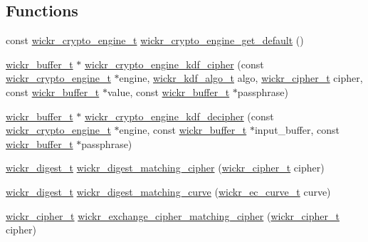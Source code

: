 \subsection*{Functions}
\begin{DoxyCompactItemize}
\item 
const \mbox{\hyperlink{structwickr__crypto__engine}{wickr\+\_\+crypto\+\_\+engine\+\_\+t}} \mbox{\hyperlink{group__wickr__crypto__engine_ga74d5cea6c7d1d6e67b1be476fbaf6235}{wickr\+\_\+crypto\+\_\+engine\+\_\+get\+\_\+default}} ()
\item 
\mbox{\hyperlink{structwickr__buffer}{wickr\+\_\+buffer\+\_\+t}} $\ast$ \mbox{\hyperlink{group__wickr__crypto__engine_ga5709d94cd09ef0fb47d1a5f59232f115}{wickr\+\_\+crypto\+\_\+engine\+\_\+kdf\+\_\+cipher}} (const \mbox{\hyperlink{structwickr__crypto__engine}{wickr\+\_\+crypto\+\_\+engine\+\_\+t}} $\ast$engine, \mbox{\hyperlink{structwickr__kdf__algo}{wickr\+\_\+kdf\+\_\+algo\+\_\+t}} algo, \mbox{\hyperlink{structwickr__cipher}{wickr\+\_\+cipher\+\_\+t}} cipher, const \mbox{\hyperlink{structwickr__buffer}{wickr\+\_\+buffer\+\_\+t}} $\ast$value, const \mbox{\hyperlink{structwickr__buffer}{wickr\+\_\+buffer\+\_\+t}} $\ast$passphrase)
\item 
\mbox{\hyperlink{structwickr__buffer}{wickr\+\_\+buffer\+\_\+t}} $\ast$ \mbox{\hyperlink{group__wickr__crypto__engine_gab60480270e80ba34aa44385633037983}{wickr\+\_\+crypto\+\_\+engine\+\_\+kdf\+\_\+decipher}} (const \mbox{\hyperlink{structwickr__crypto__engine}{wickr\+\_\+crypto\+\_\+engine\+\_\+t}} $\ast$engine, const \mbox{\hyperlink{structwickr__buffer}{wickr\+\_\+buffer\+\_\+t}} $\ast$input\+\_\+buffer, const \mbox{\hyperlink{structwickr__buffer}{wickr\+\_\+buffer\+\_\+t}} $\ast$passphrase)
\item 
\mbox{\hyperlink{structwickr__digest}{wickr\+\_\+digest\+\_\+t}} \mbox{\hyperlink{group__wickr__crypto__engine_ga18c21501a41c97f2ba79a9366343cdcf}{wickr\+\_\+digest\+\_\+matching\+\_\+cipher}} (\mbox{\hyperlink{structwickr__cipher}{wickr\+\_\+cipher\+\_\+t}} cipher)
\item 
\mbox{\hyperlink{structwickr__digest}{wickr\+\_\+digest\+\_\+t}} \mbox{\hyperlink{group__wickr__crypto__engine_ga0a708e5e46c40eae5eaeb581f6a1aed2}{wickr\+\_\+digest\+\_\+matching\+\_\+curve}} (\mbox{\hyperlink{structwickr__ec__curve}{wickr\+\_\+ec\+\_\+curve\+\_\+t}} curve)
\item 
\mbox{\hyperlink{structwickr__cipher}{wickr\+\_\+cipher\+\_\+t}} \mbox{\hyperlink{group__wickr__crypto__engine_gaf44e3be9066727bf83034d3593dc74e2}{wickr\+\_\+exchange\+\_\+cipher\+\_\+matching\+\_\+cipher}} (\mbox{\hyperlink{structwickr__cipher}{wickr\+\_\+cipher\+\_\+t}} cipher)
\end{DoxyCompactItemize}
